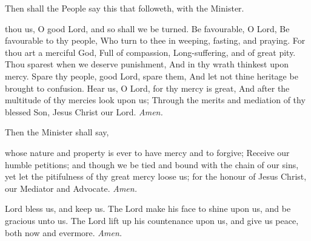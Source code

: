 \begin{rubric}
    Then shall the People say this that followeth, with the Minister.
\end{rubric}

 thou us, O good Lord, and so shall we be turned. Be favourable, O Lord, Be favourable to thy people, Who turn to thee in weeping, fasting, and praying. For thou art a merciful God, Full of compassion, Long-suffering, and of great pity. Thou sparest when we deserve punishment, And in thy wrath thinkest upon mercy. Spare thy people, good Lord, spare them, And let not thine heritage be brought to confusion. Hear us, O Lord, for thy mercy is great, And after the multitude of thy mercies look upon us; Through the merits and mediation of thy blessed Son, Jesus Christ our Lord. \textit{Amen.}

\begin{rubric}
    Then the Minister shall say,
\end{rubric}

 whose nature and property is ever to have mercy and to forgive; Receive our humble petitions; and though we be tied and bound with the chain of our sins, yet let the pitifulness of thy great mercy loose us; for the honour of Jesus Christ, our Mediator and Advocate. \textit{Amen.}

 Lord bless us, and keep us. The Lord make his face to shine upon us, and be gracious unto us. The Lord lift up his countenance upon us, and give us peace, both now and evermore. \textit{Amen.}
